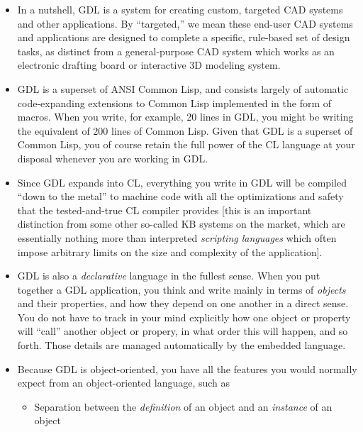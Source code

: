 \documentclass [11pt]{book}
\begin{document}
\begin{itemize}

\item In a nutshell, GDL is a system for creating custom,
	targeted CAD systems and other applications. By ``targeted,''
	we mean these end-user CAD systems and applications are
	designed to complete a specific, rule-based set of design
	tasks, as distinct from a general-purpose CAD system which
	works as an electronic drafting board or interactive 3D
	modeling system.

\item GDL is a superset of ANSI Common Lisp, and consists largely of
automatic code-expanding extensions to Common Lisp implemented in the
form of macros. When you write, for example, 20 lines in GDL, you
might be writing the equivalent of 200 lines of Common Lisp. Given
that GDL is a superset of Common Lisp, you of course retain the
full power of the CL language at your disposal whenever you are
working in GDL.
\item Since GDL expands into CL, everything you write in GDL will
be compiled ``down to the metal'' to machine code with all the
optimizations and safety that the tested-and-true CL compiler provides
[this is an important distinction from some other so-called KB systems
on the market, which are essentially nothing more than interpreted \emph{scripting languages} which often impose arbitrary limits on
the size and complexity of the application].

\item GDL is also a \emph{declarative} language in the fullest sense. When you put together a
GDL application, you think and write mainly in terms of \emph{objects} and their properties, and how they depend on one another
in a direct sense. You do not have to track in your mind explicitly
how one object or property will ``call'' another object or propery, in
what order this will happen, and so forth. Those details are managed
automatically by the embedded language.

\item Because GDL is object-oriented, you have all the features you would normally expect
from an object-oriented language, such as 

\begin{itemize}

\item Separation between the \emph{definition} of an object and an \emph{instance} of an object


\end{itemize}
\end{itemize}
\end{document}
